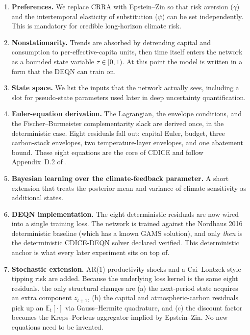 \documentclass[11pt,a4paper]{report}
\begin{document}
\begin{enumerate}
  \item \textbf{Preferences.}  We replace CRRA with Epstein--Zin so that risk aversion ($\gamma$) and the intertemporal elasticity of substitution ($\psi$) can be set independently.  This is mandatory for credible long-horizon climate risk.
  \item \textbf{Nonstationarity.}  Trends are absorbed by detrending capital and consumption to per-effective-capita units, then time itself enters the network as a bounded state variable $\tau \in [0,1)$.  At this point the model is written in a form that the DEQN can train on.
  \item \textbf{State space.}  We list the inputs that the network actually sees, including a slot for pseudo-state parameters used later in deep uncertainty quantification.
  \item \textbf{Euler-equation derivation.}  The Lagrangian, the envelope conditions, and the Fischer--Burmeister complementarity slack are derived once, in the deterministic case.  Eight residuals fall out: capital Euler, budget, three carbon-stock envelopes, two temperature-layer envelopes, and one abatement bound.  These eight equations are the core of CDICE and follow Appendix~D.2 of \citet{Folini_2021}.
  \item \textbf{Bayesian learning over the climate-feedback parameter.}  A short extension that treats the posterior mean and variance of climate sensitivity as additional states.
  \item \textbf{DEQN implementation.}  The eight deterministic residuals are now wired into a single training loss.  The network is trained against the Nordhaus 2016 deterministic baseline (which has a known GAMS solution), and only \emph{then} is the deterministic CDICE-DEQN solver declared verified.  This deterministic anchor is what every later experiment sits on top of.
  \item \textbf{Stochastic extension.}  AR(1) productivity shocks and a Cai--Lontzek-style tipping risk are added.  Because the underlying loss kernel is the same eight residuals, the only structural changes are (a) the next-period state acquires an extra component $z_{t+1}$, (b) the capital and atmospheric-carbon residuals pick up an $\mathbb{E}_t[\cdot]$ via Gauss--Hermite quadrature, and (c) the discount factor becomes the Kreps--Porteus aggregator implied by Epstein--Zin.  No new equations need to be invented.
\end{enumerate}
\end{document}
